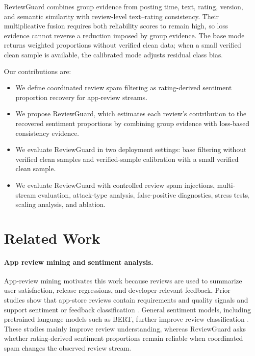 \documentclass[runningheads]{llncs}
\begin{document}
ReviewGuard combines group evidence from posting time, text, rating, version, and semantic similarity with review-level text--rating consistency. Their multiplicative fusion requires both reliability scores to remain high, so loss evidence cannot reverse a reduction imposed by group evidence. The base mode returns weighted proportions without verified clean data; when a small verified clean sample is available, the calibrated mode adjusts residual class bias.

Our contributions are:
\begin{itemize}
    \item We define coordinated review spam filtering as rating-derived sentiment proportion recovery for app-review streams.
    \item We propose ReviewGuard, which estimates each review's contribution to the recovered sentiment proportions by combining group evidence with loss-based consistency evidence.
    \item We evaluate ReviewGuard in two deployment settings: base filtering without verified clean samples and verified-sample calibration with a small verified clean sample.
    \item We evaluate ReviewGuard with controlled review spam injections, multi-stream evaluation, attack-type analysis, false-positive diagnostics, stress tests, scaling analysis, and ablation.
\end{itemize}

\section{Related Work}

\paragraph{App review mining and sentiment analysis.}
App-review mining motivates this work because reviews are used to summarize user satisfaction, release regressions, and developer-relevant feedback. Prior studies show that app-store reviews contain requirements and quality signals and support sentiment or feedback classification \cite{pagano2013user,guzman2014users,maalej2016automatic,hadi2023evaluating,mukherjee2020security}. General sentiment models, including pretrained language models such as BERT, further improve review classification \cite{devlin2019bert}. These studies mainly improve review understanding, whereas ReviewGuard asks whether rating-derived sentiment proportions remain reliable when coordinated spam changes the observed review stream.
\end{document}
